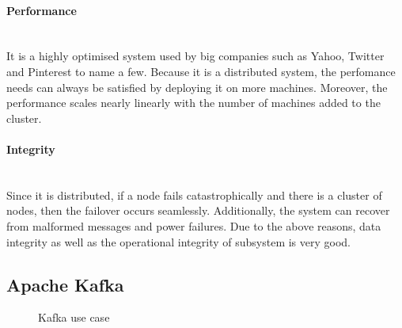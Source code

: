 \paragraph{Performance}
\mbox{}\\
It is a highly optimised system used by big companies such as Yahoo, Twitter and Pinterest to name a few. Because it is a distributed system, the perfomance needs can always be satisfied by deploying it on more machines. Moreover, the performance scales nearly linearly with the number of machines added to the cluster.
\paragraph{Integrity}
\mbox{}\\
Since it is distributed, if a node fails catastrophically and there is a cluster of nodes, then the failover occurs seamlessly. Additionally, the system can recover from malformed messages and power failures. Due to the above reasons, data integrity as well as the operational integrity of subsystem is very good.

\subsection{Apache Kafka}
\begin{figure}[h]
\caption{Kafka use case}
\end{figure}
